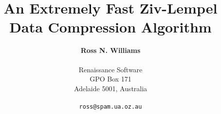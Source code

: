 %
%
%
%
%
%
%
%

\pagestyle{empty} %
\topmargin=0.5cm
\textheight=23cm
\textwidth=15cm

\title{An Extremely Fast Ziv-Lempel\\Data Compression Algorithm}

\author{{\bf Ross N. Williams}\\
\\
Renaissance Software\\
GPO Box 171\\
Adelaide 5001, Australia\\
\\
{\tt ross@spam.ua.oz.au}}
\date{}


\pagestyle{empty}
\maketitle
\parskip=8pt

\def\bold#1{{\bf #1}}
\def\b#1{{\bf #1}}
\def\i#1{{\it #1}}
\def\paper#1{\bold{[#1]}\allowbreak{}}
\def\dq#1{``{#1}''}
\def\checked#1{}
\def\fix#1{}
\def\talkabout#1{\noindent {\bf #1}}
\def\talkaboutfirstpar#1{{\bf #1}}
\def\comment#1{{(\it Comment: #1)}}
\def\citefigure#1{{\bf Figure~#1}}
\def\p#1{{\tt #1}}
\def\startsmall{\begingroup{}\footnotesize}
\def\endsmall{\endgroup{}}
\def\opt#1{\noindent\bold{#1}}
\def\startsmall{\begingroup{}\footnotesize}
\def\endsmall{\endgroup{}}
\def\mycaption#1{\begin{quotation}\footnotesize\noindent #1\end{quotation}}
\def\mytitle#1#2{\caption{#2}\label{fig:#1}}
\def\eg#1{e.g.~}
\def\ie#1{i.e.~}

